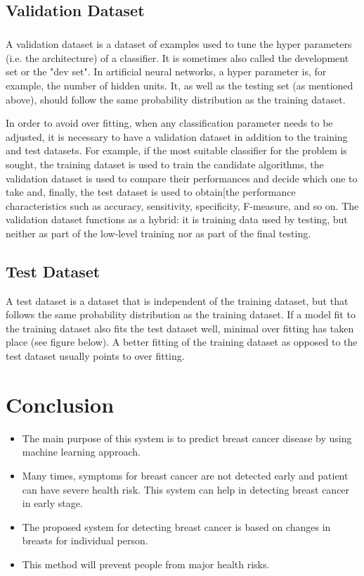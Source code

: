 \documentclass{report}
\begin{document}
\section{Validation Dataset}
\paragraph{} A validation dataset is a dataset of examples used to tune the hyper parameters (i.e. the architecture) of a classifier. It is sometimes also called the development set or the "dev set". In artificial neural networks, a hyper parameter is, for example, the number of hidden units. It, as well as the testing set (as mentioned above), should follow the same probability distribution as the training dataset.


In order to avoid over fitting, when any classification parameter needs to be adjusted, it is necessary to have a validation dataset in addition to the training and test datasets. For example, if the most suitable classifier for the problem is sought, the training dataset is used to train the candidate algorithms, the validation dataset is used to compare their performances and decide which one to take and, finally, the test dataset is used to obtain[the performance characteristics such as accuracy, sensitivity, specificity, F-measure, and so on. The validation dataset functions as a hybrid: it is training data used by testing, but neither as part of the low-level training nor as part of the final testing.


\section{Test Dataset}

A test dataset is a dataset that is independent of the training dataset, but that follows the same probability distribution as the training dataset. If a model fit to the training dataset also fits the test dataset well, minimal over fitting has taken place (see figure below). A better fitting of the training dataset as opposed to the test dataset usually points to over fitting.

\chapter{Conclusion}
  
\begin{itemize}
\item The main purpose of this system is to predict breast cancer disease by using machine learning approach. 
\item Many times, symptoms for breast cancer are not detected early and patient can have severe health risk. This system can help in detecting breast cancer in early stage. 
\item The proposed system for detecting breast cancer is based on changes in breasts for individual person.
\item This method will prevent people from major health risks.  
\end{itemize}
\end{document}
